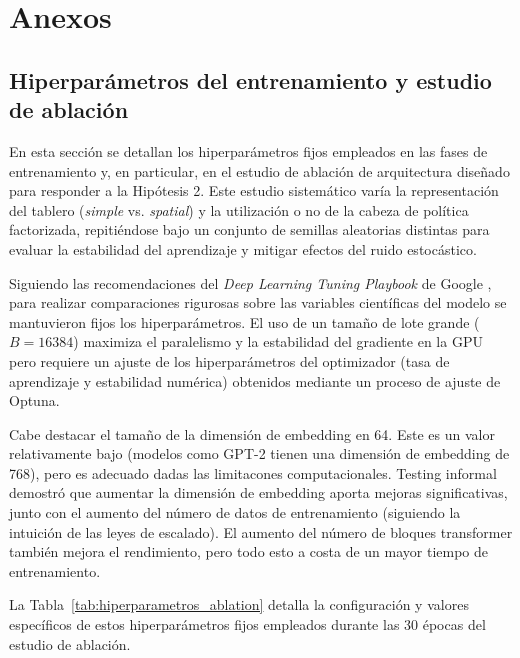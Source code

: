 \documentclass[12pt, a4paper]{article}
\let\cite\supercite
\begin{document}
\newpage
\printbibliography[heading=bibintoc, title={Referencias}]

\newpage
\appendix
\section{Anexos}\label{sec:anexos}

\subsection{Hiperparámetros del entrenamiento y estudio de ablación}\label{sec:hiperparametros_ablacion}

En esta sección se detallan los hiperparámetros fijos empleados en las fases de entrenamiento y, en particular, en el estudio de ablación de arquitectura diseñado para responder a la Hipótesis 2. Este estudio sistemático varía la representación del tablero (\textit{simple} vs. \textit{spatial}) y la utilización o no de la cabeza de política factorizada, repitiéndose bajo un conjunto de semillas aleatorias distintas para evaluar la estabilidad del aprendizaje y mitigar efectos del ruido estocástico.

Siguiendo las recomendaciones del \textit{Deep Learning Tuning Playbook} de Google \cite{deeplearningtuningplaybook}, para realizar comparaciones rigurosas sobre las variables científicas del modelo se mantuvieron fijos los hiperparámetros. El uso de un tamaño de lote grande ($B = 16384$) maximiza el paralelismo y la estabilidad del gradiente en la GPU pero requiere un ajuste de los hiperparámetros del optimizador (tasa de aprendizaje y estabilidad numérica) obtenidos mediante un proceso de ajuste de Optuna.

Cabe destacar el tamaño de la dimensión de embedding en 64. Este es un valor relativamente bajo (modelos como GPT-2 tienen una dimensión de embedding de 768), pero es adecuado dadas las limitacones computacionales. Testing informal demostró que aumentar la dimensión de embedding aporta mejoras significativas, junto con el aumento del número de datos de entrenamiento (siguiendo la intuición de las leyes de escalado). El aumento del número de bloques transformer también mejora el rendimiento, pero todo esto a costa de un mayor tiempo de entrenamiento.

La Tabla~\ref{tab:hiperparametros_ablation} detalla la configuración y valores específicos de estos hiperparámetros fijos empleados durante las 30 épocas del estudio de ablación.
\end{document}

